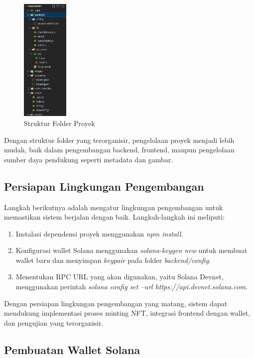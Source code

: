 \begin{figure}[H]
    \centering
    \includegraphics[width=0.2\textwidth]{gambar/3.2.1.png}
    \caption{Struktur Folder Proyek}
    \label{fig:folder-structure}
\end{figure}

Dengan struktur folder yang terorganisir, pengelolaan proyek menjadi lebih mudah, baik dalam pengembangan backend, frontend, maupun pengelolaan sumber daya pendukung seperti metadata dan gambar.

\subsection{Persiapan Lingkungan Pengembangan}
Langkah berikutnya adalah mengatur lingkungan pengembangan untuk memastikan sistem berjalan dengan baik. Langkah-langkah ini meliputi:
\begin{enumerate}
    \item Instalasi dependensi proyek menggunakan \textit{npm install}.
    \item Konfigurasi wallet Solana menggunakan \textit{solana-keygen new} untuk membuat wallet baru dan menyimpan \textit{keypair} pada folder \textit{backend/config}.
    \item Menentukan RPC URL yang akan digunakan, yaitu Solana Devnet, menggunakan perintah \textit{solana config set --url https://api.devnet.solana.com}.
\end{enumerate}

Dengan persiapan lingkungan pengembangan yang matang, sistem dapat mendukung implementasi proses minting NFT, integrasi frontend dengan wallet, dan pengujian yang terorganisir.


\subsection{Pembuatan Wallet Solana}

